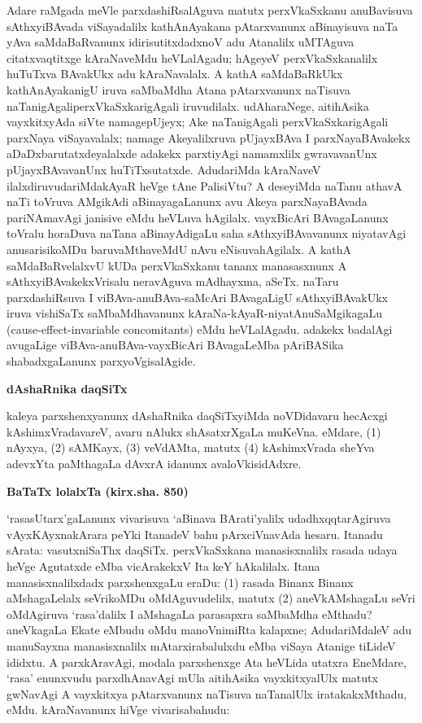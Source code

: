 Adare raMgada meVle parxdashiRsalAguva matutx perxVkaSxkanu anuBavisuva sAthxyi\break\-BAvada viSayadalilx kathAnAyakana pAtarxvanunx aBinayisuva naTa yAva saMdaBaR\-vanunx idirisutitxdadxnoV adu Atanalilx uMTAguva citatxvaqtitxge kAraNaveMdu heVLa\break\-lAgadu; hAgeyeV perxVkaSxkanalilx huTuTxva BAvakUkx adu kAraNavalalx. A kathA saMda\-BaRkUkx kathAnAyakanigU iruva saMbaMdha Atana pAtarxvanunx naTisuva naTanigAgali\break perxVkaSxkarigAgali iruvudilalx. udAharaNege, aitihAsika vayxkitxyAda siVte namage\break pUjeyx; Ake naTanigAgali perxVkaSxkarigAgali parxNaya viSayavalalx; namage Akeyalilxruva pUjayxBAva I parxNayaBAvakekx aDaDxbarutatxdeyalalxde adakekx parxtiyAgi namamxlilx gwrava\break\-vanUnx pUjayxBAvavanUnx huTiTxsutatxde. AdudariMda kAraNaveV ilalxdiruvudariMda\break kAyaR heVge tAne PalisiVtu? A deseyiMda naTanu athavA naTi toVruva AMgikAdi aBinayagaLanunx avu Akeya parxNayaBAvada pariNAmavAgi janisive eMdu heVLuva hAgilalx. vayxBicAri BAvagaLanunx toVralu horaDuva naTana aBinayAdigaLu saha sAthxyiBAvavanunx niyatavAgi anusarisikoMDu baruvaMthaveMdU nAvu eNisuva\break hAgilalx. A kathA saMdaBaRvelalxvU kUDa perxVkaSxkanu tananx manasasxnunx A sAthxyiBAvakekxVri\-salu neravAguva mAdhayxma, aSeTx. naTaru parxdashiRsuva I viBAva-anuBAva-\hbox{saMcAri} BAvagaLigU sAthxyiBAvakUkx iruva vishiSaTx saMbaMdhavanunx kAraNa-kAyaR-niya\-tAnu\-SaMgikagaLu {\rm(cause-effect-invariable concomitants)} eMdu heVLalAgadu. adakekx badalAgi avugaLige viBAva-anuBAva-vayxBicAri BAvagaLeMba pAriBASika shabadxgaLanunx parxyoVgisalAgide.

\smallskip
\begin{center}
{\Large\bf dAshaRnika daqSiTx}
\end{center}

kaleya parxshenxyanunx dAshaRnika daqSiTxyiMda noVDidavaru hecAcxgi kAshimxVradavareV, avaru nAlukx shAsatxrXgaLa muKeVna. eMdare, (1) nAyxya, (2) sAMKayx, (3) veVdAMta, matutx (4) kAshimxVrada sheYva adevxYta paMthagaLa dAvxrA idanunx avaloVkisidAdxre.

\smallskip
\begin{center}
{\Large\bf BaTaTx lolalxTa (kirx.sha. 850)}
\end{center}

`rasasUtarx'gaLanunx vivarisuva `aBinava BArati'yalilx udadhxqqtarAgiruva vAyxKAyxna\-kArara peYki ItanadeV bahu pArxciVnavAda hesaru. Itanadu sArata: vasutxniSaThx daqSiTx. perxVkaSxkana manasisxnalilx rasada udaya heVge Agutatxde eMba vicArakekxV Ita keY hAkalilalx. Itana manasisxnalilxdadx parxshenxgaLu eraDu: (1) rasada Binanx Binanx aMshagaLelalx seVrikoMDu oMdAguvudelilx, matutx (2) aneVkAMshagaLu seVri oMdAgiruva `rasa'dalilx I aMshagaLa parasapxra saMbaMdha eMthadu? aneVkagaLa Ekate eMbudu oMdu manoVnimiRta kalapxne; AdudariMdaleV adu manuSayxna manasisxnalilx mAtarx\break irabalulxdu eMba viSaya Atanige tiLideV ididxtu. A parxkAravAgi, modala parxshenxge Ata heVLida utatxra EneMdare, `rasa' enunxvudu parxdhAnavAgi mUla aitihAsika vayxkitxyalUlx matutx gwNavAgi A vayxkitxya pAtarxvanunx naTisuva naTanalUlx iratakakxMthadu, eMdu. kAraNavanunx hiVge vivarisabahudu:

